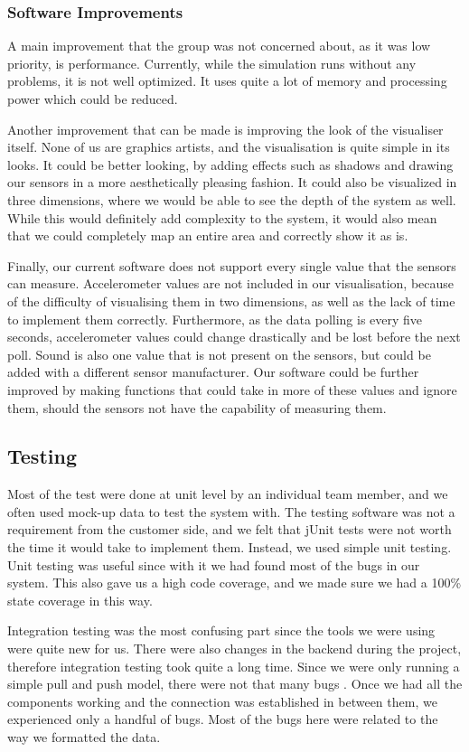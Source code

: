 \documentclass[../document]{subfiles}
\begin{document}
\subsubsection{Software Improvements}
A main improvement that the group was not concerned about, as it was low priority, is performance. Currently, while the simulation runs without any problems, it is not well optimized. It uses quite a lot of memory and processing power which could be reduced.

Another improvement that can be made is improving the look of the visualiser itself. None of us are graphics artists, and the visualisation is quite simple in its looks. It could be better looking, by adding effects such as shadows and drawing our sensors in a more aesthetically pleasing fashion. It could also be visualized in three dimensions, where we would be able to see the depth of the system as well. While this would definitely add complexity to the system, it would also mean that we could completely map an entire area and correctly show it as is.

Finally, our current software does not support every single value that the sensors can measure. Accelerometer values are not included in our visualisation, because of the difficulty of visualising them in two dimensions, as well as the lack of time to implement them correctly. Furthermore, as the data polling is every five seconds, accelerometer values could change drastically and be lost before the next poll. Sound is also one value that is not present on the sensors, but could be added with a different sensor manufacturer. Our software could be further improved by making functions that could take in more of these values and ignore them, should the sensors not have the capability of measuring them.

\subsection{Testing}
Most of the test were done at unit level by an individual team member, and we often used mock-up data to test the system with. The testing software was not a requirement from the customer side, and we felt that jUnit tests were not worth the time it would take to implement them. Instead, we used simple unit testing. Unit testing was useful since with it we had found most of the bugs in our system. This also gave us a high code coverage, and we made sure we had a 100\% state coverage in this way.

Integration testing was the most confusing part since the tools we were using were quite new for us. There were also changes in the backend during the project, therefore integration testing took quite a long time. Since we were only running a simple pull and push model, there were not that many bugs . Once we had all the components working and the connection was established in between them, we experienced only a handful of bugs. Most of the bugs here were related to the way we formatted the data.
\end{document}
